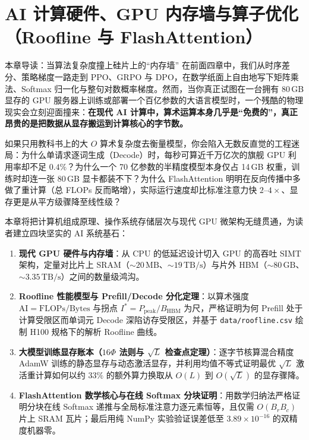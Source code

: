 \chapter[AI 硬件、Roofline 模型与 FlashAttention]{AI 计算硬件、GPU 内存墙与算子优化（Roofline 与 FlashAttention）}
\label{ch:hardware-roofline-flash}


\begin{chapIntro}{本章导读：当算法复杂度撞上硅片上的“内存墙”}
在前面四章中，我们从时序差分、策略梯度一路走到 PPO、GRPO 与 DPO，在数学纸面上自由地写下矩阵乘法、Softmax 归一化与整句对数概率梯度。然而，当你真正试图在一台拥有 80\,GB 显存的 GPU 服务器上训练或部署一个百亿参数的大语言模型时，一个残酷的物理现实会立刻迎面撞来：\textbf{在现代 AI 计算中，算术运算本身几乎是“免费的”，真正昂贵的是把数据从显存搬运到计算核心的字节数。}

如果只用教科书上的大 $O$ 算术复杂度去衡量模型，你会陷入无数反直觉的工程迷局：为什么单请求逐词生成（Decode）时，每秒可算近千万亿次的旗舰 GPU 利用率却不足 $0.4\%$？为什么一个 70 亿参数的半精度模型本身仅占 14\,GB 权重，训练时却连一张 80\,GB 显卡都装不下？为什么 FlashAttention 明明在反向传播中多做了重计算（总 FLOPs 反而略增），实际运行速度却比标准注意力快 $2\text{--}4\times$、显存更是从平方级骤降至线性级？

本章将把计算机组成原理、操作系统存储层次与现代 GPU 微架构无缝贯通，为读者建立四块坚实的 AI 系统基石：
\begin{enumerate}
  \item \textbf{现代 GPU 硬件与内存墙}：从 CPU 的低延迟设计切入 GPU 的高吞吐 SIMT 架构，定量对比片上 SRAM（$\sim 20\,\mathrm{MB}$、$\sim 19\,\mathrm{TB/s}$）与片外 HBM（$\sim 80\,\mathrm{GB}$、$\sim 3.35\,\mathrm{TB/s}$）之间的数量级鸿沟。
  \item \textbf{Roofline 性能模型与 Prefill/Decode 分化定理}：以算术强度 $\mathrm{AI} = \mathrm{FLOPs}/\mathrm{Bytes}$ 与拐点 $I^* = P_{\mathrm{peak}}/B_{\mathrm{HBM}}$ 为尺，严格证明为何 Prefill 处于计算受限区而单词元 Decode 深陷访存受限区，并基于 \texttt{data/roofline.csv} 绘制 H100 规格下的解析 Roofline 曲线。
  \item \textbf{大模型训练显存账本（$16\Phi$ 法则与 $\sqrt{L}$ 检查点定理）}：逐字节核算混合精度 AdamW 训练的静态显存与动态激活显存，并利用均值不等式证明最优 $\sqrt{L}$ 激活重计算如何以约 $33\%$ 的额外算力换取从 $O(L)$ 到 $O(\sqrt{L})$ 的显存骤降。
  \item \textbf{FlashAttention 数学核心与在线 Softmax 分块证明}：用数学归纳法严格证明分块在线 Softmax 递推与全局标准注意力逐元素恒等，且仅需 $O(B_r B_c)$ 片上 SRAM 瓦片；最后用纯 NumPy 实验验证误差低至 $3.89\times 10^{-16}$ 的双精度机器零。
\end{enumerate}
\end{chapIntro}

